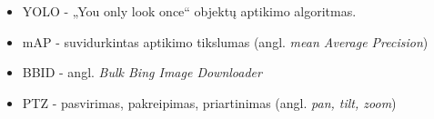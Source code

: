 \documentclass{VUMIFPSkursinis}
\begin{document}
\printbibliography[heading=bibintoc]  

\begin{itemize}
    \item YOLO - „You only look once“ objektų aptikimo algoritmas.
    \item mAP - suvidurkintas aptikimo tikslumas (angl. \emph{mean Average Precision})
    \item BBID - angl. \emph{Bulk Bing Image Downloader}
    \item PTZ - pasvirimas, pakreipimas, priartinimas (angl. \emph{pan, tilt, zoom})
\end{itemize}
\end{document}
